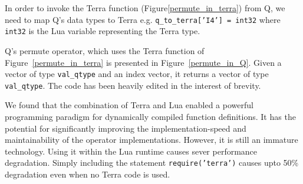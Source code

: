 In order to invoke the Terra function (Figure\ref{permute_in_terra}) from Q, we
need to map Q's data types to Terra e.g. 
{\tt q\_to\_terra['I4'] = int32}  where {\tt int32} is the Lua variable representing the Terra type.

Q's permute operator, which uses the Terra function of
Figure~\ref{permute_in_terra} 
is presented in Figure~\ref{permute_in_Q}. 
Given a vector of type {\tt val\_qtype} and an index vector, it 
returns a vector of type {\tt val\_qtype}.
The code has been heavily edited in the interest of brevity.

\begin{figure}
\centering
{}
\end{figure}

We found that 
the combination of Terra and Lua enabled a powerful programming paradigm for
dynamically compiled function definitions. It has the potential for significantly improving the implementation-speed and maintainability of the operator implementations. 
However, it is
still an immature technology. Using it within the Lua runtime causes sever
performance degradation. Simply including the statement 
{\tt require('terra')} causes upto 50\% degradation even when no Terra code is
used. 

